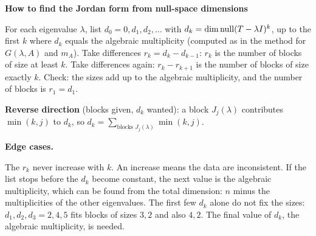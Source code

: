 \documentclass[10pt]{scrartcl}
\newenvironment{methodbox}[1]{\begin{mdframed}[style=mdbluebox,linecolor=NavyBlue,backgroundcolor=NavyBlue!3]\textbf{\color{NavyBlue}#1}\par\vspace{2pt}}{\end{mdframed}}
\begin{document}
\begin{fig}
\end{fig}

\begin{methodbox}{How to find the Jordan form from null-space dimensions}
\begin{enumerate}[label=\arabic*.,leftmargin=1.5em,itemsep=2pt,topsep=2pt]
  \ii For each eigenvalue $\lambda$, list $d_0=0,d_1,d_2,\dots$ with $d_k=\dim\operatorname{null}(T-\lambda I)^k$, up to the first $k$ where $d_k$ equals the algebraic multiplicity (computed as in the method for $G(\lambda,A)$ and $m_A$).
  \ii Take differences $r_k=d_k-d_{k-1}$: $r_k$ is the number of blocks of size at least $k$.
  \ii Take differences again: $r_k-r_{k+1}$ is the number of blocks of size exactly $k$.
  \ii Check: the sizes add up to the algebraic multiplicity, and the number of blocks is $r_1=d_1$.
\end{enumerate}
\textbf{Reverse direction} (blocks given, $d_k$ wanted): a block $J_j(\lambda)$ contributes $\min(k,j)$ to $d_k$, so $d_k=\sum_{\text{blocks }J_j(\lambda)}\min(k,j)$.

\textbf{Edge cases.}
\begin{itemize}
  \ii The $r_k$ never increase with $k$. An increase means the data are inconsistent.
  \ii If the list stops before the $d_k$ become constant, the next value is the algebraic multiplicity, which can be found from the total dimension: $n$ minus the multiplicities of the other eigenvalues.
  \ii The first few $d_k$ alone do not fix the sizes: $d_1,d_2,d_3=2,4,5$ fits blocks of sizes $3,2$ and also $4,2$. The final value of $d_k$, the algebraic multiplicity, is needed.
\end{itemize}
\end{methodbox}
\end{document}

